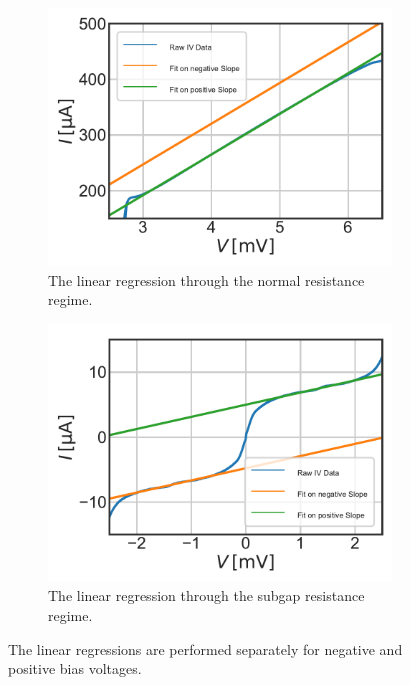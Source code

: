\documentclass[]{article}
\begin{document}
\begin{figure}
	\centering              
	\begin{subfigure}[t]{0.49\textwidth}
		\centering
		\includegraphics[width=\linewidth]{./../IV_Class_Unit_Test/2020_01_14/Normal_Resistance_Fit.pdf}
		\caption{The linear regression through the normal resistance regime.}
	\end{subfigure}
	\begin{subfigure}[t]{0.49\textwidth}
		\centering
		\includegraphics[width=\linewidth]{./../IV_Class_Unit_Test/2020_01_14/Subgap_Resistance_Fit.pdf}
		\caption{The linear regression through the subgap resistance regime.}
	\end{subfigure}
	\caption[]{The linear regressions are performed separately for negative and positive bias voltages.
	}
	\label{fig:ResistanceLinearRegression}
\end{figure}
\end{document}
